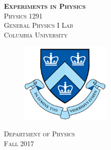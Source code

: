 \begin{titlepage}
\begin{center}
\textsc{\Huge\bf Experiments in Physics}
\\[5cm]
\textsc{\huge Physics 1291}
\\[0.3cm]
\textsc{\huge General Physics I Lab}
\\[4cm]
\textsc{\large Columbia University}
\\[0.5cm]
\begin{figure}[h]
  \centering
  \includegraphics[height=4cm]{./pic/Columbia-Logo.png}
\end{figure}
\textsc{Department of Physics}
\\[1cm]
\textsc{Fall 2017}
\end{center}
\end{titlepage}
